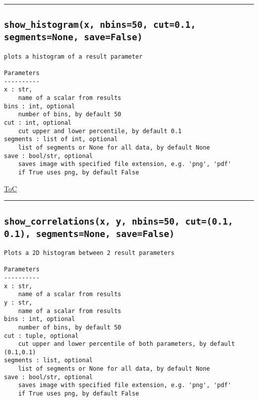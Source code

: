 \documentclass{article}
\begin{document}


\vspace{5mm}

\hrule

\subsection*{\texttt{show\_histogram(x, nbins=50, cut=0.1, segments=None, save=False)}}

\begin{lstlisting}[language=docstring]
plots a histogram of a result parameter

Parameters
----------
x : str,
    name of a scalar from results
bins : int, optional
    number of bins, by default 50
cut : int, optional
    cut upper and lower percentile, by default 0.1
segments : list of int, optional
    list of segments or None for all data, by default None
save : bool/str, optional
    saves image with specified file extension, e.g. 'png', 'pdf'
    if True uses png, by default False
\end{lstlisting}

\begin{flushright}

\hyperref[toc]{ToC}

\end{flushright}



\vspace{5mm}

\hrule

\subsection*{\texttt{show\_correlations(x, y, nbins=50, cut=(0.1, 0.1), segments=None, save=False)}}

\begin{lstlisting}[language=docstring]
Plots a 2D histogram between 2 result parameters

Parameters
----------
x : str,
    name of a scalar from results
y : str,
    name of a scalar from results
bins : int, optional
    number of bins, by default 50
cut : tuple, optional
    cut upper and lower percentile of both parameters, by default (0.1,0.1)
segments : list, optional
    list of segments or None for all data, by default None
save : bool/str, optional
    saves image with specified file extension, e.g. 'png', 'pdf'
    if True uses png, by default False
\end{lstlisting}
\end{document}
